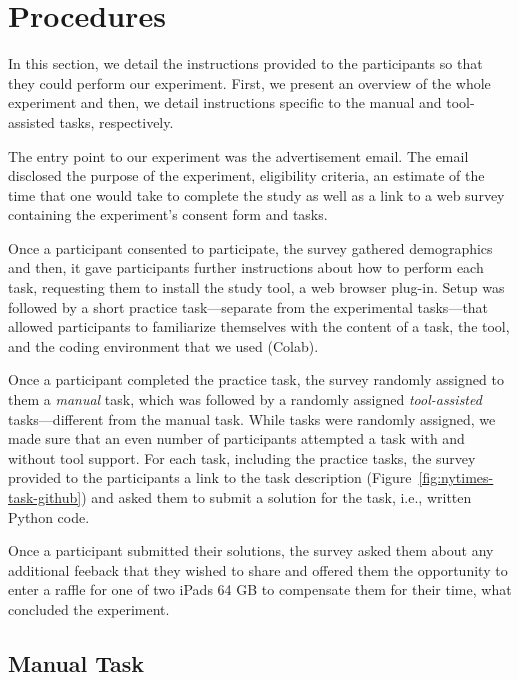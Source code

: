 
\section{Procedures}
\label{cp6:procedures}



In this section, we detail the instructions provided to the participants so that 
they could perform our experiment. 
First, we present an overview of the whole experiment and then, we detail
instructions specific to the manual and tool-assisted tasks, respectively.



The entry point to our experiment was the advertisement email.
The email disclosed the purpose of the experiment, eligibility criteria, an estimate of the time that one would take to complete the study as well as a link 
to a web survey containing the experiment's consent form and tasks. 


Once a participant consented to participate, the survey gathered demographics and then, 
it gave participants further instructions 
about how to perform each task, requesting them to install the study tool, a web browser plug-in.
Setup was followed by a short practice task---separate from the experimental tasks---that allowed participants to familiarize themselves with the content of a task, the tool, and the coding environment that we used (Colab). 


Once a participant completed the practice task, the survey randomly assigned to them a \textit{manual} task, which was followed by a randomly assigned \textit{tool-assisted} tasks---different from the manual task. While tasks were randomly assigned, we made sure that an even number of participants attempted a task with and without tool support.
For each task, including the practice tasks, the survey provided to the participants a link 
to the task description (Figure~\ref{fig:nytimes-task-github}) and asked them to submit a solution for the task, i.e., written Python code. 


Once a participant submitted their solutions, the survey
asked them about any additional feeback that they wished to share and 
offered them the opportunity to enter a raffle for one of two iPads 64 GB 
to compensate them for their time, what concluded the experiment.



\subsection{Manual Task}
\label{cp6:procedures-manual}



